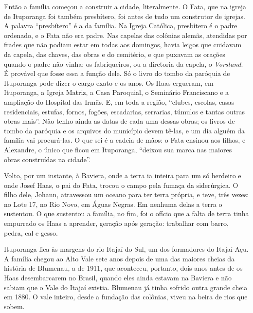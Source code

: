 \documentclass[
  brazilian,
  11pt,
  openany]{book}
\begin{document}
Então a família começou a construir a cidade, literalmente. O Fata, que
na igreja de Ituporanga foi também presbítero, foi antes de tudo um
construtor de igrejas. A palavra ``presbítero'' é a da família. Na
Igreja Católica, presbítero é o padre ordenado, e o Fata não era padre.
Nas capelas das colônias alemãs, atendidas por frades que não podiam
estar em todas aos domingos, havia leigos que cuidavam da capela, das
chaves, das obras e do cemitério, e que puxavam as orações quando o
padre não vinha: os fabriqueiros, ou a diretoria da capela, o
\emph{Vorstand}. É provável que fosse essa a função dele. Só o livro do
tombo da paróquia de Ituporanga pode dizer o cargo exato e os anos. Os
Haas ergueram, em Ituporanga, a Igreja Matriz, a Casa Paroquial, o
Seminário Franciscano e a ampliação do Hospital das Irmãs. E, em toda a
região, ``clubes, escolas, casas residenciais, estufas, fornos, fogões,
escadarias, serrarias, túmulos e tantas outras obras mais''. Não tenho
ainda as datas de cada uma dessas obras; os livros de tombo da paróquia
e os arquivos do município devem tê-las, e um dia alguém da família vai
procurá-las. O que sei é a cadeia de mãos: o Fata ensinou aos filhos, e
Alexandre, o único que ficou em Ituporanga, ``deixou sua marca nas
maiores obras construídas na cidade''.

Volto, por um instante, à Baviera, onde a terra ia inteira para um só
herdeiro e onde Josef Haas, o pai do Fata, trocou o campo pela fumaça da
siderúrgica. O filho dele, Johann, atravessou um oceano para ter terra
própria, e teve, três vezes: no Lote 17, no Rio Novo, em Águas Negras.
Em nenhuma delas a terra o sustentou. O que sustentou a família, no fim,
foi o ofício que a falta de terra tinha empurrado os Haas a aprender,
geração após geração: trabalhar com barro, pedra, cal e gesso.

Ituporanga fica às margens do rio Itajaí do Sul, um dos formadores do
Itajaí-Açu. A família chegou ao Alto Vale sete anos depois de uma das
maiores cheias da história de Blumenau, a de 1911, que aconteceu,
portanto, dois anos antes de os Haas desembarcarem no Brasil, quando
eles ainda estavam na Baviera e não sabiam que o Vale do Itajaí existia.
Blumenau já tinha sofrido outra grande cheia em 1880. O vale inteiro,
desde a fundação das colônias, viveu na beira de rios que sobem.
\end{document}
